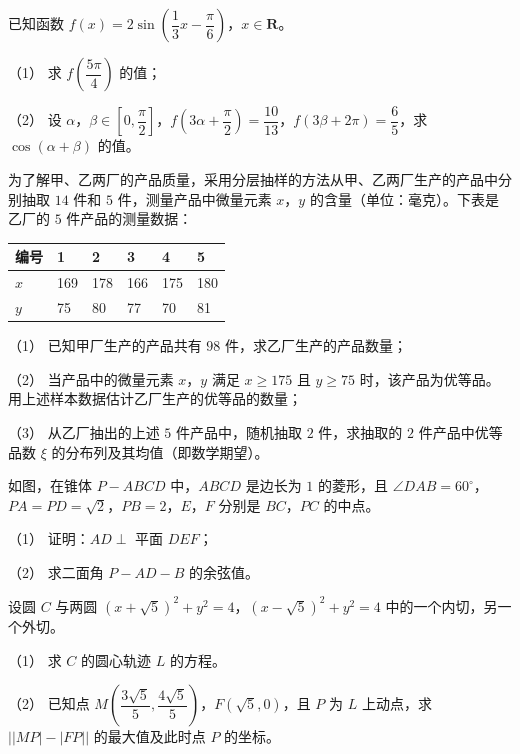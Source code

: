 \begin{question}
已知函数 $f(x)=2\sin\left(\dfrac13x-\dfrac{\pi}{6}\right)$，$x\in\mathbf R$。

（1） 求 $f\left(\dfrac{5\pi}{4}\right)$ 的值；

（2） 设 $\alpha$，$\beta\in\left[0,\dfrac{\pi}{2}\right]$，$f\left(3\alpha+\dfrac{\pi}{2}\right)=\dfrac{10}{13}$，$f(3\beta+2\pi)=\dfrac65$，求 $\cos(\alpha+\beta)$ 的值。

\end{question}
\begin{question}
为了解甲、乙两厂的产品质量，采用分层抽样的方法从甲、乙两厂生产的产品中分别抽取 $14$ 件和 $5$ 件，测量产品中微量元素 $x$，$y$ 的含量（单位：毫克）。下表是乙厂的 $5$ 件产品的测量数据：

\begin{center}
\begin{tabular}{llllll}
\toprule
编号 & 1 & 2 & 3 & 4 & 5 \\
\midrule
$x$ & 169 & 178 & 166 & 175 & 180 \\
$y$ & 75 & 80 & 77 & 70 & 81 \\
\bottomrule
\end{tabular}
\end{center}

（1） 已知甲厂生产的产品共有 $98$ 件，求乙厂生产的产品数量；

（2） 当产品中的微量元素 $x$，$y$ 满足 $x\geqslant175$ 且 $y\geqslant75$ 时，该产品为优等品。用上述样本数据估计乙厂生产的优等品的数量；

（3） 从乙厂抽出的上述 $5$ 件产品中，随机抽取 $2$ 件，求抽取的 $2$ 件产品中优等品数 $\xi$ 的分布列及其均值（即数学期望）。

\Needspace{0.4\textheight}
\end{question}
\begin{question}
如图，在锥体 $P-ABCD$ 中，$ABCD$ 是边长为 $1$ 的菱形，且 $\angle DAB=60^\circ$，$PA=PD=\sqrt2$，$PB=2$，$E$，$F$ 分别是 $BC$，$PC$ 的中点。

（1） 证明：$AD\perp$ 平面 $DEF$；

（2） 求二面角 $P-AD-B$ 的余弦值。
\nopagebreak[4]
\begin{center}\end{center}
\nopagebreak[4]
\end{question}
\begin{question}
设圆 $C$ 与两圆 $(x+\sqrt5)^2+y^2=4$，$(x-\sqrt5)^2+y^2=4$ 中的一个内切，另一个外切。

（1） 求 $C$ 的圆心轨迹 $L$ 的方程。

（2） 已知点 $M\left(\dfrac{3\sqrt5}{5},\dfrac{4\sqrt5}{5}\right)$，$F(\sqrt5,0)$，且 $P$ 为 $L$ 上动点，求 $\bigl||MP|-|FP|\bigr|$ 的最大值及此时点 $P$ 的坐标。

\end{question}
